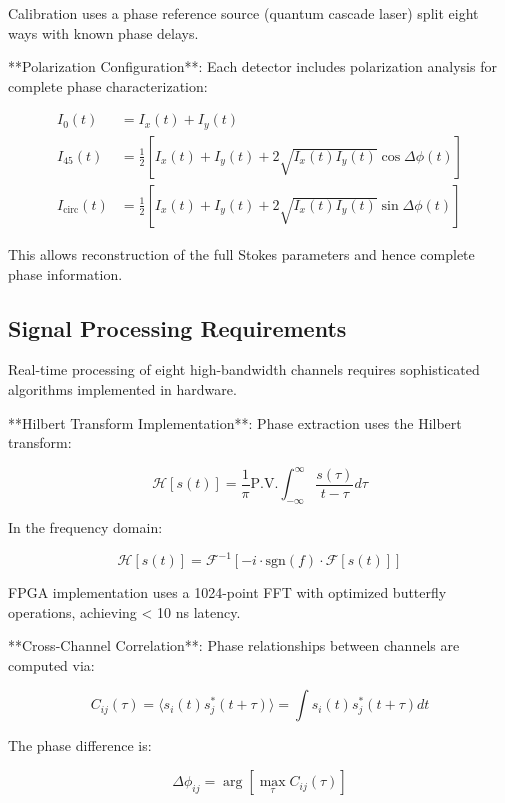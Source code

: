 \documentclass[12pt,a4paper]{report}
\begin{document}
Calibration uses a phase reference source (quantum cascade laser) split eight ways with known phase delays.

**Polarization Configuration**: Each detector includes polarization analysis for complete phase characterization:

\begin{align}
I_0(t) &= I_x(t) + I_y(t) \\
I_{45}(t) &= \frac{1}{2}[I_x(t) + I_y(t) + 2\sqrt{I_x(t)I_y(t)}\cos\Delta\phi(t)] \\
I_{\text{circ}}(t) &= \frac{1}{2}[I_x(t) + I_y(t) + 2\sqrt{I_x(t)I_y(t)}\sin\Delta\phi(t)]
\end{align}

This allows reconstruction of the full Stokes parameters and hence complete phase information.

\subsection{Signal Processing Requirements}

Real-time processing of eight high-bandwidth channels requires sophisticated algorithms implemented in hardware.

**Hilbert Transform Implementation**: Phase extraction uses the Hilbert transform:

\begin{equation}
\mathcal{H}[s(t)] = \frac{1}{\pi} \text{P.V.} \int_{-\infty}^{\infty} \frac{s(\tau)}{t - \tau} d\tau
\end{equation}

In the frequency domain:

\begin{equation}
\mathcal{H}[s(t)] = \mathcal{F}^{-1}[-i \cdot \text{sgn}(f) \cdot \mathcal{F}[s(t)]]
\end{equation}

FPGA implementation uses a 1024-point FFT with optimized butterfly operations, achieving < 10 ns latency.

**Cross-Channel Correlation**: Phase relationships between channels are computed via:

\begin{equation}
C_{ij}(\tau) = \langle s_i(t) s_j^*(t + \tau) \rangle = \int s_i(t) s_j^*(t + \tau) dt
\end{equation}

The phase difference is:

\begin{equation}
\Delta\phi_{ij} = \arg[\max_\tau C_{ij}(\tau)]
\end{equation}
\end{document}

